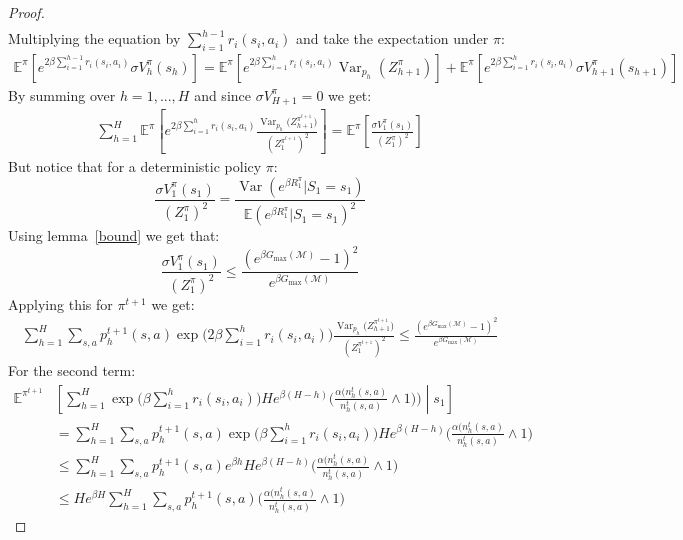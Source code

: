 \documentclass[final,12pt]{colt2026} %
\begin{document}
\begin{proof}
\begin{align*}
\end{align*}
Multiplying the equation by $\sum_{i=1}^{h-1} r_i(s_i,a_i)$ and take the expectation under $\pi$:
\begin{align*}
    \mathbb{E}^\pi\left[ e^{2\beta \sum_{i=1}^{h-1} r_i(s_i,a_i)} \sigma V_h^\pi(s_h) \right] = \mathbb{E}^\pi\left[ e^{2\beta \sum_{i=1}^h r_i(s_i,a_i)} \operatorname{Var}_{p_h}\left(Z_{h+1}^\pi \right) \right] + \mathbb{E}^\pi\left[ e^{2\beta \sum_{i=1}^h r_i(s_i,a_i)} \sigma V_{h+1}^\pi(s_{h+1}) \right]
\end{align*} 
By summing over $h = 1,...,H$ and since $\sigma V_{H+1}^\pi = 0$ we get:
\begin{align*}
    \sum_{h=1}^H \mathbb{E}^{\pi} \left[ e^{2\beta \sum_{i=1}^h r_i(s_i, a_i)} \frac{\operatorname{Var}_{p_h}\big(Z_{h+1}^{\pi^{t+1}}\big)}{(Z_1^{\pi^{t+1}})^2} \right] = \mathbb{E}^{\pi} \left[ \frac{\sigma V_1^{\pi}(s_1)}{(Z_1^{\pi})^2} \right]
\end{align*}
But notice that for a deterministic policy $\pi$:
$$\frac{\sigma V_1^{\pi}(s_1)}{(Z_1^{\pi})^2} = \frac{\operatorname{Var}(e^{\beta R_1^\pi}|S_1 =s_1)}{\mathbb{E}(e^{\beta R_1^\pi}|S_1 = s_1)^2}$$
Using lemma~\ref{bound} we get that:
$$\frac{\sigma V_1^{\pi}(s_1)}{(Z_1^{\pi})^2} \leq \frac{(e^{\beta G_{\text{max}}(\mathcal{M})} - 1)^2}{e^{\beta G_{\text{max}}(\mathcal{M})}}$$
Applying this for $\pi^{t+1}$ we get:
\begin{align*}
    \sum_{h=1}^H \sum_{s,a}p_h^{t+1}(s,a) \exp\Big(2\beta \sum_{i=1}^{h} r_i(s_i,a_i)\Big) \frac{\operatorname{Var}_{p_h}\big(Z_{h+1}^{\pi^{t+1}}\big)}{(Z_1^{\pi^{t+1}})^2} \leq \frac{(e^{\beta G_{\text{max}}(\mathcal{M})} - 1)^2}{e^{\beta G_{\text{max}}(\mathcal{M})}}
\end{align*}
For the second term:
\begin{align*}
   \mathbb{E}^{\pi^{t+1}} & \left[
\sum_{h=1}^{H}
\exp\Big(\beta\sum_{i=1}^{h} r_i(s_i,a_i)\Big)
He^{\beta(H-h)}\big(\frac{\alpha\big(n_h^t(s,a)}{n_h^t(s,a)} \wedge 1 \big)
\Bigg)
\middle| s_1
\right] \\&=  \sum_{h=1}^H \sum_{s,a} p_h^{t+1}(s,a)\exp\Big(\beta\sum_{i=1}^{h} r_i(s_i,a_i)\Big)
He^{\beta(H-h)}\big(\frac{\alpha\big(n_h^t(s,a)}{n_h^t(s,a)} \wedge 1 \big) \\&\leq  \sum_{h=1}^H \sum_{s,a} p_h^{t+1}(s,a)e^{\beta h} He^{\beta(H-h)}\big(\frac{\alpha\big(n_h^t(s,a)}{n_h^t(s,a)} \wedge 1 \big) \\
&\leq  H e^{\beta H} \sum_{h=1}^H \sum_{s,a} p_h^{t+1}(s,a)\big(\frac{\alpha\big(n_h^t(s,a)}{n_h^t(s,a)} \wedge 1 \big)

\end{align*}
\end{proof}
\end{document}
